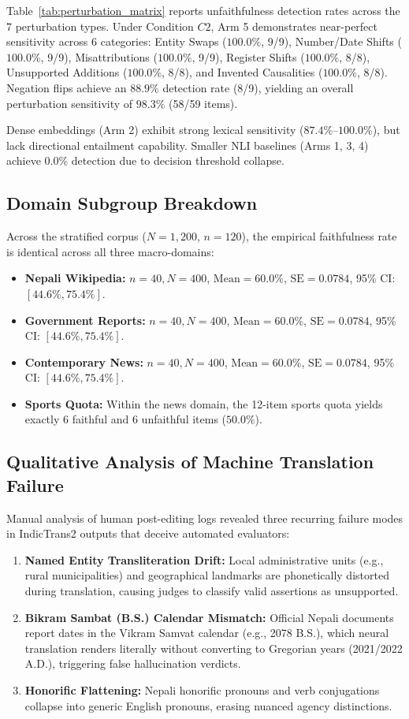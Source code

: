 \documentclass[conference]{IEEEtran}
\begin{document}
Table~\ref{tab:perturbation_matrix} reports unfaithfulness detection rates across the 7 perturbation types. Under Condition $C2$, Arm 5 demonstrates near-perfect sensitivity across 6 categories: Entity Swaps ($100.0\%$, 9/9), Number/Date Shifts ($100.0\%$, 9/9), Misattributions ($100.0\%$, 9/9), Register Shifts ($100.0\%$, 8/8), Unsupported Additions ($100.0\%$, 8/8), and Invented Causalities ($100.0\%$, 8/8). Negation flips achieve an $88.9\%$ detection rate (8/9), yielding an overall perturbation sensitivity of $98.3\%$ (58/59 items).

Dense embeddings (Arm 2) exhibit strong lexical sensitivity ($87.4\%$--$100.0\%$), but lack directional entailment capability. Smaller NLI baselines (Arms 1, 3, 4) achieve 0.0\% detection due to decision threshold collapse.

\subsection{Domain Subgroup Breakdown}
Across the stratified corpus ($N=1,200$, $n=120$), the empirical faithfulness rate is identical across all three macro-domains:
\begin{itemize}
    \item \textbf{Nepali Wikipedia:} $n=40, N=400$, $\text{Mean} = 60.0\%$, $\text{SE} = 0.0784$, 95\% CI: $[44.6\%, 75.4\%]$.
    \item \textbf{Government Reports:} $n=40, N=400$, $\text{Mean} = 60.0\%$, $\text{SE} = 0.0784$, 95\% CI: $[44.6\%, 75.4\%]$.
    \item \textbf{Contemporary News:} $n=40, N=400$, $\text{Mean} = 60.0\%$, $\text{SE} = 0.0784$, 95\% CI: $[44.6\%, 75.4\%]$.
    \item \textbf{Sports Quota:} Within the news domain, the 12-item sports quota yields exactly 6 faithful and 6 unfaithful items ($50.0\%$).
\end{itemize}

\subsection{Qualitative Analysis of Machine Translation Failure}
Manual analysis of human post-editing logs revealed three recurring failure modes in IndicTrans2 outputs that deceive automated evaluators:
\begin{enumerate}
    \item \textbf{Named Entity Transliteration Drift:} Local administrative units (e.g., rural municipalities) and geographical landmarks are phonetically distorted during translation, causing judges to classify valid assertions as unsupported.
    \item \textbf{Bikram Sambat (B.S.) Calendar Mismatch:} Official Nepali documents report dates in the Vikram Samvat calendar (e.g., 2078 B.S.), which neural translation renders literally without converting to Gregorian years (2021/2022 A.D.), triggering false hallucination verdicts.
    \item \textbf{Honorific Flattening:} Nepali honorific pronouns and verb conjugations collapse into generic English pronouns, erasing nuanced agency distinctions.
\end{enumerate}
\end{document}
